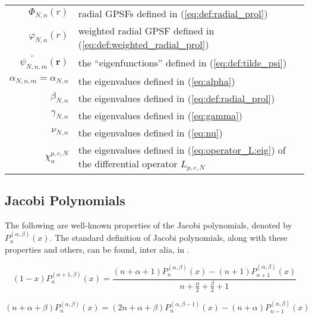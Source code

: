\documentclass[12pt]{article}
\begin{document}
\begin{table}[htbp]
\begin{center}
\begin{tabular}{r p{10cm} }
$\Phi_{N,n}(r)$ &               radial GPSFs defined in (\ref{eq:def:radial_prol}) \\
$\varphi_{N,n}(r)$ &            weighted radial GPSF defined in (\ref{eq:def:weighted_radial_prol}) \\
$\widetilde{\psi_{N,n,m}}({\bm r})$ &    the ``eigenfunctions'' defined in (\ref{eq:def:tilde_psi}) \\
$\alpha_{N,n,m} = \alpha_{N,n}$ & the eigenvalues defined in (\ref{eq:alpha}) \\
$\beta_{N,n}$ &                 the eigenvalues defined in (\ref{eq:def:radial_prol}) \\
$\gamma_{N,n}$ &                the eigenvalues defined in (\ref{eq:gamma}) \\
$\nu_{N,n}$ &                   the eigenvalues defined in (\ref{eq:nu}) \\
$\chi^{p,c,N}_n$ &               the eigenvalues defined in (\ref{eq:operator_L:eig}) of the differential operator $L_{p,c,N}$  \\
\bottomrule
\end{tabular}
\end{center}
\label{table;notation}
\end{table}









%
%
%
\subsection{Jacobi Polynomials}\label{sec:jacobi}
The following are well-known properties of the Jacobi polynomials, denoted by $P_n^{(\alpha ,\beta )}(x)$. 
The standard definition of Jacobi polynomials, along with these properties and others, can be found, inter alia, in \cite{abramowitz1964handbook}.


\begin{equation}\label{eq:jac1}
(1-x) P_n^{(\alpha +1,\beta )}(x)=\frac{(n+\alpha +1) P_n^{(\alpha ,\beta )}(x)-(n+1)
   P_{n+1}^{(\alpha ,\beta )}(x)}{n+\frac{\alpha }{2}+\frac{\beta }{2}+1}
\end{equation}

\begin{equation}\label{eq:jac2}
(n+\alpha +\beta ) P_n^{(\alpha ,\beta )}(x)=(2 n+\alpha +\beta ) P_n^{(\alpha ,\beta
   -1)}(x)-(n+\alpha ) P_{n-1}^{(\alpha ,\beta )}(x)
\end{equation}
\end{document}
